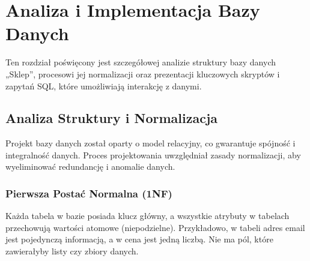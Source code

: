 \documentclass[a4paper,11pt,polish]{sphinxmanual}
\begin{document}
\begin{sphinxVerbatim}[commandchars=\\\{\},numbers=left,firstnumber=1,stepnumber=1]
   

      
\end{sphinxVerbatim}

\sphinxstepscope


\chapter{Analiza i Implementacja Bazy Danych}
\label{\detokenize{rozdzial_4:analiza-i-implementacja-bazy-danych}}\label{\detokenize{rozdzial_4:rozdzial-4}}\label{\detokenize{rozdzial_4::doc}}
\sphinxAtStartPar
Ten rozdział poświęcony jest szczegółowej analizie struktury bazy danych „Sklep”, procesowi jej normalizacji oraz prezentacji kluczowych skryptów i zapytań SQL, które umożliwiają interakcję z danymi.


\section{Analiza Struktury i Normalizacja}
\label{\detokenize{rozdzial_4:analiza-struktury-i-normalizacja}}
\sphinxAtStartPar
Projekt bazy danych został oparty o model relacyjny, co gwarantuje spójność i integralność danych. Proces projektowania uwzględniał zasady normalizacji, aby wyeliminować redundancję i anomalie danych.


\subsection{Pierwsza Postać Normalna (1NF)}
\label{\detokenize{rozdzial_4:pierwsza-postac-normalna-1nf}}
\sphinxAtStartPar
Każda tabela w bazie posiada klucz główny, a wszystkie atrybuty w tabelach przechowują wartości atomowe (niepodzielne). Przykładowo, w tabeli  adres email jest pojedynczą informacją, a w  cena jest jedną liczbą. Nie ma pól, które zawierałyby listy czy zbiory danych.
\end{document}
